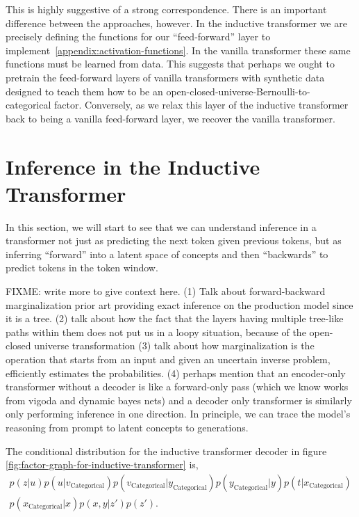 \documentclass{article}
\begin{document}
This is highly suggestive of a strong correspondence.  There is an important difference between the approaches, however.  In the inductive transformer we are precisely defining the functions for our ``feed-forward'' layer to implement~\ref{appendix:activation-functions}.  In the vanilla transformer these same functions must be learned from data.  This suggests that perhaps we ought to pretrain the feed-forward layers of vanilla transformers with synthetic data designed to teach them how to be an open-closed-universe-Bernoulli-to-categorical factor. Conversely, as we relax this layer of the inductive transformer back to being a vanilla feed-forward layer, we recover the vanilla transformer.


\section{Inference in the Inductive Transformer}

In this section, we will start to see that we can understand inference in a transformer not just as predicting the next token given previous tokens, but as inferring ``forward'' into a latent space of concepts and then ``backwards'' to predict tokens in the token window.

FIXME: write more to give context here.  (1) Talk about forward-backward marginalization prior art providing exact inference on the production model since it is a tree.  (2) talk about how the fact that the layers having multiple tree-like paths within them does not put us in a loopy situation, because of the open-closed universe transformation (3) talk about how marginalization is the operation that starts from an input and given an uncertain inverse problem, efficiently estimates the probabilities. (4) perhaps mention that an encoder-only transformer without a decoder is like a forward-only pass (which we know works from vigoda and dynamic bayes nets) and a decoder only transformer is similarly only performing inference in one direction.  In principle, we can trace the model's reasoning from prompt to latent concepts to generations.

The conditional distribution for the inductive transformer decoder in figure \ref{fig:factor-graph-for-inductive-transformer} is,
\begin{align}
\label{eq:rho_marginalized_out}
p(z|u)p(u|v_{\text{Categorical}})p(v_{\text{Categorical}}|y_{\text{Categorical}})p(y_{\text{Categorical}}|y)p(t|x_{\text{Categorical}}) \nonumber \\
p(x_{\text{Categorical}}|x)p(x, y|z')p(z').
\end{align}
\end{document}
